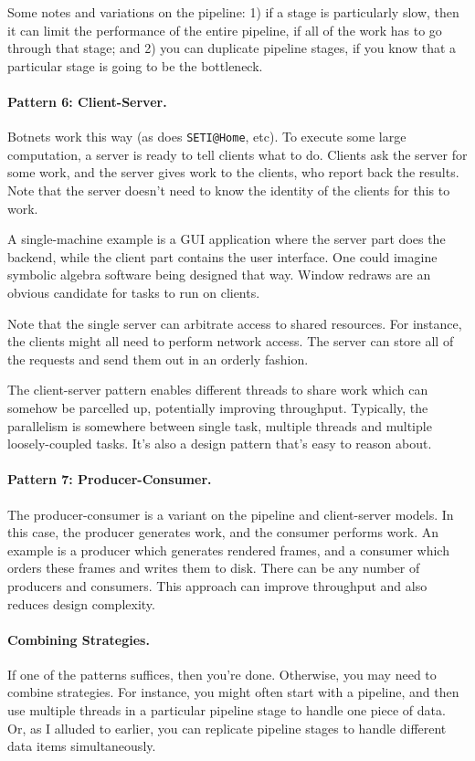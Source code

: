 \documentclass[a4paper]{report}
\begin{document}
Some notes and variations on the pipeline: 1) if a stage is
particularly slow, then it can limit the performance of the entire
pipeline, if all of the work has to go through that stage; and 2) you
can duplicate pipeline stages, if you know that a particular stage is
going to be the bottleneck.

\paragraph{Pattern 6: Client-Server.} Botnets work this way (as does \verb+SETI@Home+,
etc). To execute some large computation, a server is ready to tell
clients what to do.  Clients ask the server for some work, and the
server gives work to the clients, who report back the results. Note
that the server doesn't need to know the identity of the clients for
this to work.

A single-machine example is a GUI application where the server part
does the backend, while the client part contains the user interface.
One could imagine symbolic algebra software being designed that way.
Window redraws are an obvious candidate for tasks to run on clients.

Note that the single server can arbitrate access to shared resources.
For instance, the clients might all need to perform network access.
The server can store all of the requests and send them out in an
orderly fashion.

The client-server pattern enables different threads to share work
which can somehow be parcelled up, potentially improving
throughput. Typically, the parallelism is somewhere between single
task, multiple threads and multiple loosely-coupled tasks. It's also a
design pattern that's easy to reason about.

\paragraph{Pattern 7: Producer-Consumer.} The producer-consumer is 
a variant on the pipeline and client-server models. In this case, the
producer generates work, and the consumer performs work. An example is
a producer which generates rendered frames, and a consumer which
orders these frames and writes them to disk. There can be any number
of producers and consumers. This approach can improve throughput
and also reduces design complexity.

\paragraph{Combining Strategies.} If one of the patterns suffices,
then you're done. Otherwise, you may need to combine strategies.
For instance, you might often start with a pipeline, and then 
use multiple threads in a particular pipeline stage to handle one
piece of data. Or, as I alluded to earlier, you can replicate
pipeline stages to handle different data items simultaneously.
\end{document}
